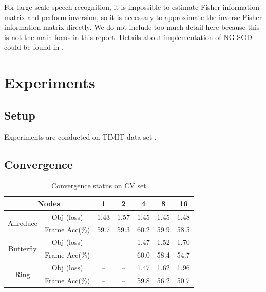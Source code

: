 \documentclass{article}
\begin{document}
For large scale speech recognition, it is impossible to estimate Fisher information matrix and perform inversion, so it is necessary to 
approximate the inverse Fisher information matrix directly. We do not include too much detail here because this is not the main focus 
in this report. Details about implementation of NG-SGD could be found in \cite{povey2014parallel}.

\section{Experiments}
\subsection{Setup}
Experiments are conducted on TIMIT data set \cite{timit}.

\subsection{Convergence}
\begin{table}
  \centering
  \begin{tabular}{c|c|c|c|c|c|c}
    \hline
           \multicolumn{2}{c|}{Nodes}         & 1    & 2    & 4    & 8    & 16 \\
    \hline
\multirow{2}{*}{Allreduce} &    Obj (loss)    & 1.43 & 1.57 & 1.45 & 1.45 & 1.48\\
                           &    Frame Acc(\%) & 59.7 & 59.3 & 60.2 & 59.9 & 58.5\\
    \hline
\multirow{2}{*}{Butterfly} &    Obj (loss)    & --   & --   & 1.47 & 1.52 & 1.70\\
                           &    Frame Acc(\%) & --   & --   & 60.0 & 58.4 & 54.7 \\
    \hline
\multirow{2}{*}{Ring}      &    Obj (loss)    & --   & --   & 1.47 & 1.62 & 1.96\\
                           &    Frame Acc(\%) & --   & --   & 59.8 & 56.2 & 50.7 \\
    \hline
  \end{tabular}
  \caption{Convergence status on CV set}

\end{table}
\end{document}
